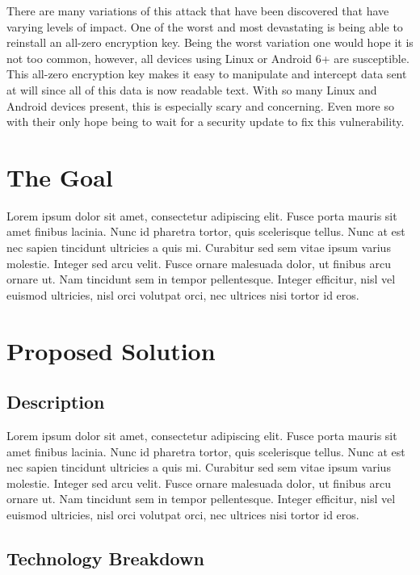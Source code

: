 \documentclass{article}
\begin{document}
There are many variations of this attack that have been discovered that
have varying levels of impact. One of the worst and most devastating is
being able to reinstall an all-zero encryption key. Being the worst
variation one would hope it is not too common, however, all devices
using Linux or Android 6+ are susceptible. This all-zero encryption key
makes it easy to manipulate and intercept data sent at will since all of
this data is now readable text. With so many Linux and Android devices
present, this is especially scary and concerning. Even more so with
their only hope being to wait for a security update to fix this
vulnerability.

\section{The Goal}\label{the-goal}

Lorem ipsum dolor sit amet, consectetur adipiscing elit. Fusce porta
mauris sit amet finibus lacinia. Nunc id pharetra tortor, quis
scelerisque tellus. Nunc at est nec sapien tincidunt ultricies a quis
mi. Curabitur sed sem vitae ipsum varius molestie. Integer sed arcu
velit. Fusce ornare malesuada dolor, ut finibus arcu ornare ut. Nam
tincidunt sem in tempor pellentesque. Integer efficitur, nisl vel
euismod ultricies, nisl orci volutpat orci, nec ultrices nisi tortor id
eros.

\section{Proposed Solution}\label{proposed-solution}

\subsection{Description}\label{description}

Lorem ipsum dolor sit amet, consectetur adipiscing elit. Fusce porta
mauris sit amet finibus lacinia. Nunc id pharetra tortor, quis
scelerisque tellus. Nunc at est nec sapien tincidunt ultricies a quis
mi. Curabitur sed sem vitae ipsum varius molestie. Integer sed arcu
velit. Fusce ornare malesuada dolor, ut finibus arcu ornare ut. Nam
tincidunt sem in tempor pellentesque. Integer efficitur, nisl vel
euismod ultricies, nisl orci volutpat orci, nec ultrices nisi tortor id
eros.

\subsection{Technology Breakdown}\label{technology-breakdown}
\end{document}

